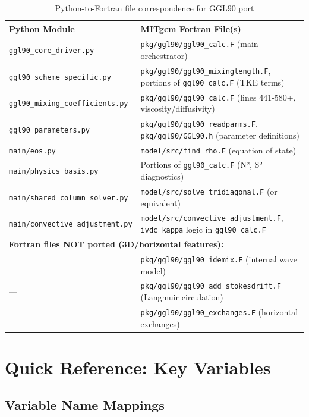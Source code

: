 \documentclass[11pt]{article}
\begin{document}
\begin{table}[h]
\centering
\begin{tabular}{lp{6cm}}
\toprule
\textbf{Python Module} & \textbf{MITgcm Fortran File(s)} \\
\midrule
\verb|ggl90_core_driver.py| & \verb|pkg/ggl90/ggl90_calc.F| (main orchestrator) \\
\verb|ggl90_scheme_specific.py| & \verb|pkg/ggl90/ggl90_mixinglength.F|, portions of \verb|ggl90_calc.F| (TKE terms) \\
\verb|ggl90_mixing_coefficients.py| & \verb|pkg/ggl90/ggl90_calc.F| (lines 441-580+, viscosity/diffusivity) \\
\verb|ggl90_parameters.py| & \verb|pkg/ggl90/ggl90_readparms.F|, \verb|pkg/ggl90/GGL90.h| (parameter definitions) \\
\verb|main/eos.py| & \verb|model/src/find_rho.F| (equation of state) \\
\verb|main/physics_basis.py| & Portions of \verb|ggl90_calc.F| (N², S² diagnostics) \\
\verb|main/shared_column_solver.py| & \verb|model/src/solve_tridiagonal.F| (or equivalent) \\
\verb|main/convective_adjustment.py| & \verb|model/src/convective_adjustment.F|, \verb|ivdc_kappa| logic in \verb|ggl90_calc.F| \\
\midrule
\multicolumn{2}{l}{\textbf{Fortran files NOT ported (3D/horizontal features):}} \\
— & \verb|pkg/ggl90/ggl90_idemix.F| (internal wave model) \\
— & \verb|pkg/ggl90/ggl90_add_stokesdrift.F| (Langmuir circulation) \\
— & \verb|pkg/ggl90/ggl90_exchanges.F| (horizontal exchanges) \\
\bottomrule
\end{tabular}
\caption{Python-to-Fortran file correspondence for GGL90 port}
\end{table}

\section{Quick Reference: Key Variables}
\label{sec:variables}

\subsection{Variable Name Mappings}
\end{document}
